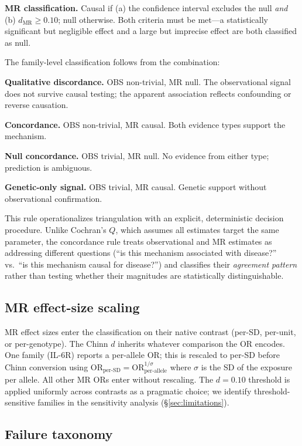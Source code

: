 \documentclass[11pt]{article}
\begin{document}
\textbf{MR classification.} Causal if (a) the confidence interval excludes the null \emph{and} (b) $d_{\text{MR}} \geq 0.10$; null otherwise. Both criteria must be met---a statistically significant but negligible effect and a large but imprecise effect are both classified as null.

The family-level classification follows from the combination:

\textbf{Qualitative discordance.} OBS non-trivial, MR null. The observational signal does not survive causal testing; the apparent association reflects confounding or reverse causation.

\textbf{Concordance.} OBS non-trivial, MR causal. Both evidence types support the mechanism.

\textbf{Null concordance.} OBS trivial, MR null. No evidence from either type; prediction is ambiguous.

\textbf{Genetic-only signal.} OBS trivial, MR causal. Genetic support without observational confirmation.

This rule operationalizes triangulation \citep{lawlor2016} with an explicit, deterministic decision procedure. Unlike Cochran's $Q$, which assumes all estimates target the same parameter, the concordance rule treats observational and MR estimates as addressing different questions (``is this mechanism associated with disease?'' vs.\ ``is this mechanism causal for disease?'') and classifies their \emph{agreement pattern} rather than testing whether their magnitudes are statistically distinguishable.

\subsection{MR effect-size scaling}

MR effect sizes enter the classification on their native contrast (per-SD, per-unit, or per-genotype). The Chinn $d$ inherits whatever comparison the OR encodes. One family (IL-6R) reports a per-allele OR; this is rescaled to per-SD before Chinn conversion using $\text{OR}_{\text{per-SD}} = \text{OR}_{\text{per-allele}}^{1/\sigma}$ where $\sigma$ is the SD of the exposure per allele. All other MR ORs enter without rescaling. The $d = 0.10$ threshold is applied uniformly across contrasts as a pragmatic choice; we identify threshold-sensitive families in the sensitivity analysis (\S\ref{sec:limitations}).

\subsection{Failure taxonomy}
\end{document}
